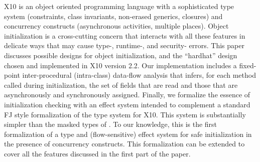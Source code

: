 X10 is an object oriented programming language with a sophisticated
    type system (constraints, class invariants, non-erased generics, closures)
    and concurrency constructs (asynchronous activities, multiple places).
Object initialization is a cross-cutting concern that interacts with all these features
    in delicate ways that may cause type-, runtime-, and security- errors.
This paper discusses possible designs for object initialization,
    and the ``hardhat'' design chosen and implemented in X10 version 2.2.
Our implementation includes a
    fixed-point inter-procedural (intra-class)
    data-flow analysis
    that infers, for each method called during initialization,
    the set of fields that are read and
    those that are asynchronously and synchronously assigned.
Finally, we formalize the essence of initialization checking with an
effect system intended to complement a standard FJ style
formalization of the type system for X10. This system is substantially
simpler than the masked types of \cite{XinQi:2009}. To our knowledge, this is
the first formalization of a type and (flow-sensitive) effect system
for safe initialization in the presence of concurrency
constructs. This formalization can be extended to cover all the
features discussed in the first part of the paper.
